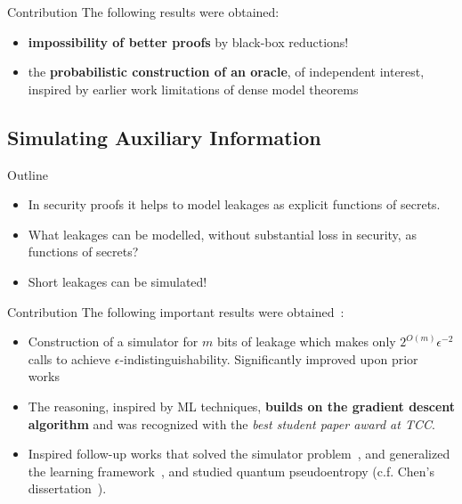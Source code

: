 \documentclass[9pt]{beamer}					%
\begin{document}
\begin{frame}{Contribution}
The following results were obtained:
\begin{itemize}
    \item[\emoji{key}] \textbf{impossibility of better proofs} by black-box reductions!
    \item[\emoji{key}] the \textbf{probabilistic construction of an oracle}, of independent interest, inspired by earlier work limitations of dense model theorems~\cite{DBLP:journals/eccc/Zhang11}
\end{itemize}
\end{frame}

\subsection{Simulating Auxiliary Information }

\begin{frame}{Outline}
\begin{itemize}
\item[\emoji{open-book}] In security proofs it helps to model leakages as explicit functions of secrets.
\item[\emoji{question}] What leakages can be modelled, without substantial loss in security, as functions of secrets?
\item[\emoji{raised-hand}] Short leakages can be simulated!
\end{itemize}
\end{frame}

\begin{frame}{Contribution}
The following important results were obtained~\cite{skorski2016simulating}:
\begin{itemize}
\item[\emoji{key}] Construction of a simulator for $m$ bits of leakage which makes only $2^{O(m)}\epsilon^{-2}$ calls to achieve $\epsilon$-indistinguishability. Significantly improved upon prior works~\cite{DBLP:conf/crypto/VadhanZ13,DBLP:conf/tcc/JetchevP14}
\item[\emoji{trophy}] The reasoning, inspired by ML techniques, \textbf{builds on the gradient descent algorithm} and was recognized with the \emph{best student paper award at TCC}.
\item[\emoji{fire}] Inspired follow-up works that solved the simulator problem~\cite{Chen_2018}, and generalized the learning framework~\cite{skorski2016subgradient,skorskiapproximating}, and studied quantum pseudoentropy (c.f. Chen's dissertation~\cite{chen2019computational}). 
\end{itemize}
\end{frame}
\end{document}
